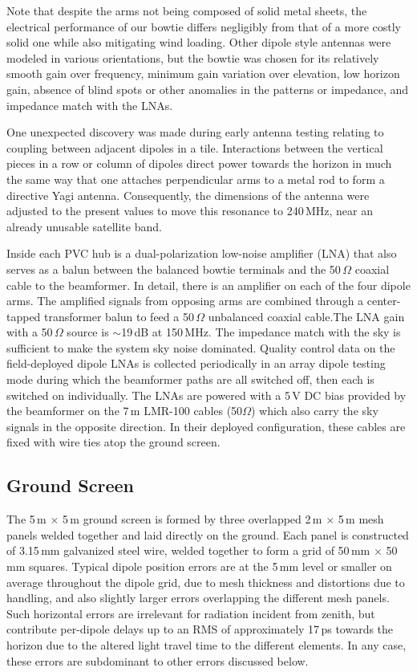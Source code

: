 \begin{subappendices}
Note that despite the arms not being composed of solid metal sheets, the electrical performance of our bowtie differs negligibly from that of a more costly solid one while also mitigating wind loading. Other dipole style antennas were modeled in various orientations, but the bowtie was chosen for its relatively smooth gain over frequency, minimum gain variation over elevation, low horizon gain, absence of blind spots or other anomalies in the patterns or impedance, and impedance match with the LNAs.

One unexpected discovery was made during early antenna testing relating to coupling between adjacent dipoles in a tile. Interactions between the vertical pieces in a row or column of dipoles direct power towards the horizon in much the same way that one attaches perpendicular arms to a metal rod to form a directive Yagi antenna. Consequently, the dimensions of the antenna were adjusted to the present values to move this resonance to 240\,MHz, near an already unusable satellite band. 

Inside each PVC hub is a dual-polarization low-noise amplifier (LNA) that also serves as a balun between the balanced bowtie terminals and the 50\,$\Omega$ coaxial cable to the beamformer. In detail, there is an amplifier on each of the four dipole arms. The amplified signals from opposing arms are combined through a center-tapped transformer balun to feed a 50\,$\Omega$ unbalanced coaxial cable.The LNA gain with a 50\,$\Omega$ source is $\sim$19\,dB at 150\,MHz. The impedance match with the sky is sufficient to make the system sky noise dominated. Quality control data on the field-deployed dipole LNAs is collected periodically in an array dipole testing mode during which the beamformer paths are all switched off, then each is switched on individually. The LNAs are powered with a 5\,V DC bias provided by the beamformer on the 7\,m LMR-100 cables (50$\Omega$) which also carry the sky signals in the opposite direction. In their deployed configuration, these cables are fixed with wire ties atop the ground screen. 

\subsection{Ground Screen}
\label{sec:groundscreen}
The 5\,m $\times$ 5\,m ground screen is formed by three overlapped 2\,m $\times$ 5\,m mesh panels welded together and laid directly on the ground. Each panel is constructed of 3.15\,mm galvanized steel wire, welded together to form a grid of 50\,mm $\times$ 50\,mm squares. Typical dipole position errors are at the 5\,mm level or smaller on average throughout the dipole grid, due to mesh thickness and distortions due to handling, and also slightly larger errors overlapping the different mesh panels. Such horizontal errors are irrelevant for radiation incident from zenith, but contribute per-dipole delays up to an RMS of approximately 17\,ps towards the horizon due to the altered light travel time to the different elements. In any case, these errors are subdominant to other errors discussed below.


\end{subappendices}
